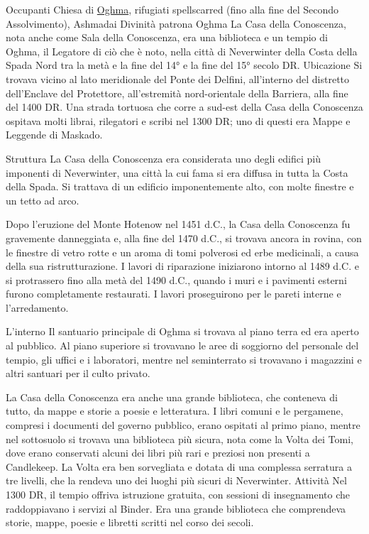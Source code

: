 \documentclass{article}
\begin{document}
Occupanti
Chiesa di \href{https://forgottenrealms.fandom.com/wiki/Oghma}{Oghma}, rifugiati spellscarred (fino alla fine del Secondo Assolvimento), Ashmadai
Divinità patrona
Oghma
La Casa della Conoscenza, nota anche come Sala della Conoscenza, era una biblioteca e un tempio di Oghma, il Legatore di ciò che è noto, nella città di Neverwinter della Costa della Spada Nord tra la metà e la fine del 14° e la fine del 15° secolo DR.
Ubicazione
Si trovava vicino al lato meridionale del Ponte dei Delfini, all'interno del distretto dell'Enclave del Protettore, all'estremità nord-orientale della Barriera, alla fine del 1400 DR. Una strada tortuosa che corre a sud-est della Casa della Conoscenza ospitava molti librai, rilegatori e scribi nel 1300 DR; uno di questi era Mappe e Leggende di Maskado.

Struttura\newline
La Casa della Conoscenza era considerata uno degli edifici più imponenti di Neverwinter, una città la cui fama si era diffusa in tutta la Costa della Spada. Si trattava di un edificio imponentemente alto, con molte finestre e un tetto ad arco.

Dopo l'eruzione del Monte Hotenow nel 1451 d.C., la Casa della Conoscenza fu gravemente danneggiata e, alla fine del 1470 d.C., si trovava ancora in rovina, con le finestre di vetro rotte e un aroma di tomi polverosi ed erbe medicinali, a causa della sua ristrutturazione. I lavori di riparazione iniziarono intorno al 1489 d.C. e si protrassero fino alla metà del 1490 d.C., quando i muri e i pavimenti esterni furono completamente restaurati. I lavori proseguirono per le pareti interne e l'arredamento.

L'interno\newline
Il santuario principale di Oghma si trovava al piano terra ed era aperto al pubblico. Al piano superiore si trovavano le aree di soggiorno del personale del tempio, gli uffici e i laboratori, mentre nel seminterrato si trovavano i magazzini e altri santuari per il culto privato.

La Casa della Conoscenza era anche una grande biblioteca, che conteneva di tutto, da mappe e storie a poesie e letteratura. I libri comuni e le pergamene, compresi i documenti del governo pubblico, erano ospitati al primo piano, mentre nel sottosuolo si trovava una biblioteca più sicura, nota come la Volta dei Tomi, dove erano conservati alcuni dei libri più rari e preziosi non presenti a Candlekeep. La Volta era ben sorvegliata e dotata di una complessa serratura a tre livelli, che la rendeva uno dei luoghi più sicuri di Neverwinter.
Attività\newline
Nel 1300 DR, il tempio offriva istruzione gratuita, con sessioni di insegnamento che raddoppiavano i servizi al Binder. Era una grande biblioteca che comprendeva storie, mappe, poesie e libretti scritti nel corso dei secoli.
\end{document}
